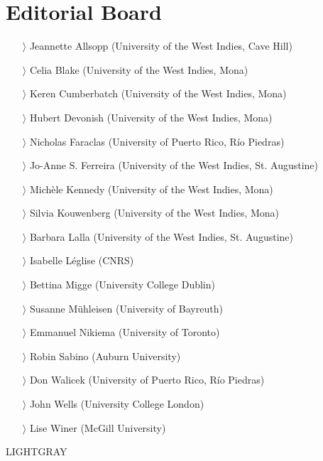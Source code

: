 \documentclass[
notumble,
nofoldmark,
]{leaflet}
\begin{document}
{    \section{Editorial Board }   
    \begin{itemize}
    \item[$\rangle$] Jeannette Allsopp (University of the West Indies, Cave Hill)
    \item[$\rangle$] Celia Blake (University of the West Indies, Mona)
    \item[$\rangle$] Keren Cumberbatch (University of the West Indies, Mona)
    \item[$\rangle$] Hubert Devonish (University of the West Indies, Mona)
    \item[$\rangle$] Nicholas Faraclas (University of Puerto Rico, R\'io Piedras)
    \item[$\rangle$] Jo-Anne S. Ferreira (University of the West Indies, St. Augustine)
    \item[$\rangle$] Mich\`ele Kennedy (University of the West Indies, Mona)
    \item[$\rangle$] Silvia Kouwenberg (University of the West Indies, Mona)
    \item[$\rangle$] Barbara Lalla (University of the West Indies, St. Augustine)
    \item[$\rangle$] Isabelle L\'eglise (CNRS)
    \item[$\rangle$] Bettina Migge (University College Dublin)
    \item[$\rangle$] Susanne M\"uhleisen (University of Bayreuth)
    \item[$\rangle$] Emmanuel Nikiema (University of Toronto)
    \item[$\rangle$] Robin Sabino (Auburn University)
    \item[$\rangle$] Don Walicek (University of Puerto Rico, Río Piedras)
    \item[$\rangle$] John Wells (University College London)
    \item[$\rangle$] Lise Winer (McGill University)
    \end{itemize}
}{LIGHTGRAY}
\end{document}
